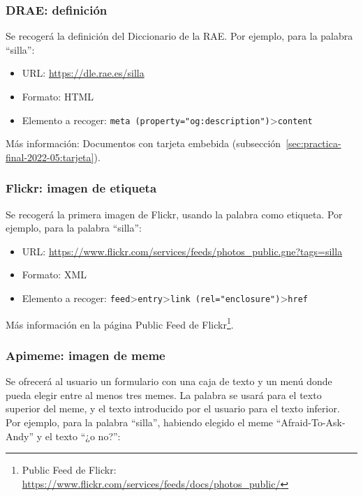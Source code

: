 \subsubsection{DRAE: definición}

Se recogerá la definición del Diccionario de la RAE. Por ejemplo, para la palabra ``silla'':

\begin{itemize}
\item URL: \url{https://dle.rae.es/silla}
\item Formato: HTML
\item Elemento a recoger: \texttt{meta (property="og:description")}>\texttt{content}
\end{itemize}

Más información: Documentos con tarjeta embebida (subsección~\ref{sec:practica-final-2022-05:tarjeta}).

\subsubsection{Flickr: imagen de etiqueta}

Se recogerá la primera imagen de Flickr, usando la palabra como etiqueta. Por ejemplo, para la palabra ``silla'':

\begin{itemize}
\item URL: \url{https://www.flickr.com/services/feeds/photos_public.gne?tags=silla}
\item Formato: XML
\item Elemento a recoger: \texttt{feed}>\texttt{entry}>\texttt{link (rel="enclosure")}>\texttt{href}
\end{itemize}

Más información en la página Public Feed de Flickr\footnote{Public Feed de Flickr: \\ \url{https://www.flickr.com/services/feeds/docs/photos_public/}}.

\subsubsection{Apimeme: imagen de meme}

Se ofrecerá al usuario un formulario con una caja de texto y un menú donde pueda elegir entre al menos tres memes. La palabra se usará para el texto superior del meme, y el texto introducido por el usuario para el texto inferior. Por ejemplo, para la palabra ``silla'', habiendo elegido el meme ``Afraid-To-Ask-Andy'' y el texto ``¿o no?'':

